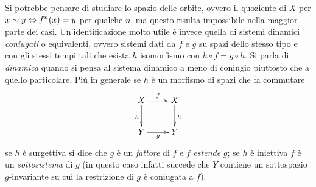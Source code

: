 Si potrebbe pensare di studiare lo spazio delle orbite, ovvero il quoziente di $X$ per $x\sim y\Leftrightarrow f^n(x)=y$ per qualche $n$, 
ma questo risulta impossibile nella maggior parte dei casi. 
Un'identificazione molto utile è invece quella di sistemi dinamici \emph{coniugati} o equivalenti, 
ovvero sistemi dati da $f$ e $g$ su spazi dello stesso tipo e con gli stessi tempi tali che esista $h$ isomorfismo con $h\circ f=g\circ h$. 
Si parla di \emph{dinamica} quando si pensa al sistema dinamico a meno di coniugio piuttosto che a quello particolare. 
Più in generale se $h$ è un morfismo di spazi che fa commutare
\[ \xymatrix{ X \ar[r]^f \ar[d]_h & X \ar[d]^h \\ Y \ar[r]_g & Y } \]
se $h$ è surgettiva si dice che $g$ è un \emph{fattore} di $f$ e $f$ \emph{estende} $g$; 
se $h$ è iniettiva $f$ è un \emph{sottosistema} di $g$ (in questo caso infatti succede che $Y$ contiene un sottospazio $g$-invariante su cui la restrizione di $g$ è coniugata a $f$). 

